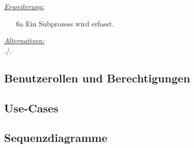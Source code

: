 \underline{\emph{Erweiterung:}}
\begin{itemize}
    \item [6a] Ein Subprozess wird erfasst.
\end{itemize}
\underline{\emph{Alternativen:}} \\
./.\\

\subsection{Benutzerollen und Berechtigungen}
\subsection{Use-Cases}
\subsection{Sequenzdiagramme}


